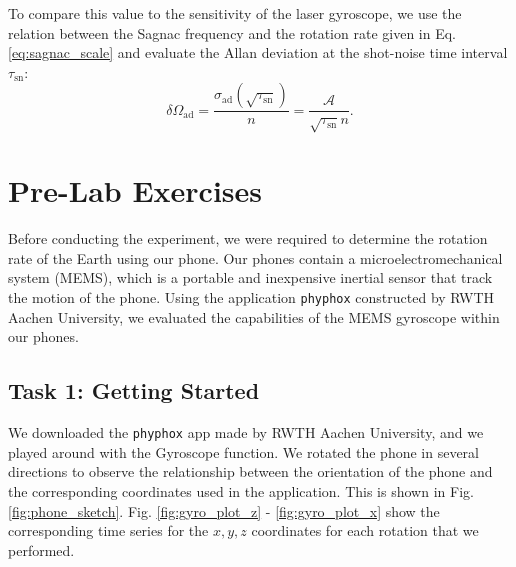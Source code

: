 \documentclass[a4paper]{report}
\numberwithin{equation}{section}
\begin{document}
To compare this value to the sensitivity of the laser gyroscope, we use the relation between the Sagnac frequency and the 
rotation rate given in Eq. \ref{eq:sagnac_scale} and evaluate the Allan deviation at the shot-noise time interval $\tau_{\mathrm{sn}}$:
\begin{equation}
	\delta \Omega_{\mathrm{ad}} = \frac{\sigma_{\text{ad}} (\sqrt{\tau_{\mathrm{sn}}})}{n} = \frac{\mathcal{A}}{\sqrt{\tau_{\mathrm{sn}}}n} . 
	\label{eq:allan_sensitivity}
\end{equation}



\chapter{Pre-Lab Exercises}

Before conducting the experiment, we were required to determine the rotation rate of the Earth using our phone. Our phones
contain a microelectromechanical system (MEMS), which is a portable and inexpensive inertial sensor that track the motion of
the phone. Using the application \texttt{phyphox} constructed by RWTH Aachen University, we evaluated the capabilities
of the MEMS gyroscope within our phones. 

\section{Task 1: Getting Started}

We downloaded the \texttt{phyphox} app made by RWTH Aachen University, and we played around with the Gyroscope function. We rotated the phone in several directions 
to observe the relationship between the orientation of the phone and the corresponding coordinates used in the application. This is shown in Fig. \ref{fig:phone_sketch}. 
Fig. \ref{fig:gyro_plot_z} - \ref{fig:gyro_plot_x} show the corresponding time series for the $x, y, z$ coordinates for each rotation that we performed. 
\end{document}
